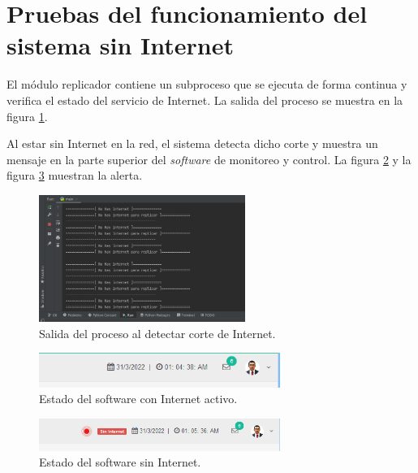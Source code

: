 \section{Pruebas del funcionamiento del sistema sin Internet}

El módulo replicador contiene un subproceso que se ejecuta de forma continua y verifica el estado del servicio de Internet. La salida del proceso se muestra en la figura \ref{fig:inter1}. 

Al estar sin Internet en la red, el sistema detecta dicho corte y muestra un mensaje en la parte superior del \emph{software} de monitoreo y control. La figura \ref{fig:inter2} y la figura \ref{fig:inter3} muestran la alerta.

\begin{figure}[htpb]
\centering 
\includegraphics[width=0.6\textwidth]{./Figures/test/replicador/desconexion3.png}
\caption{Salida del proceso al detectar corte de Internet.}
\label{fig:inter1}
\end{figure}
\vspace{0.25cm}
\begin{figure}[htpb]
\centering 
\includegraphics[width=0.7\textwidth]{./Figures/test/replicador/desconexion1.png}
\caption{Estado del software con Internet activo.}
\label{fig:inter2}
\end{figure}
\begin{figure}[htpb]
\centering 
\includegraphics[width=0.7\textwidth]{./Figures/test/replicador/desconexion2.png}
\caption{Estado del software sin Internet.}
\label{fig:inter3}
\end{figure}



